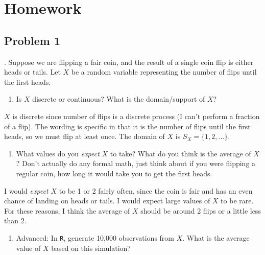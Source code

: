 \documentclass[
]{book}
\providecommand{\tightlist}{%
  \setlength{\itemsep}{0pt}\setlength{\parskip}{0pt}}
\begin{document}
\hypertarget{homework-9}{%
\section{Homework}\label{homework-9}}

\hypertarget{problem-1-9}{%
\subsection{Problem 1}\label{problem-1-9}}

. Suppose we are flipping a fair coin, and the result of a single coin flip is either heads or tails. Let \(X\) be a random variable representing the number of flips until the first heads.

\begin{enumerate}
\def\labelenumi{\alph{enumi}.}
\tightlist
\item
  Is \(X\) discrete or continuous? What is the domain/support of \(X\)?
\end{enumerate}

\(X\) is discrete since number of flips is a discrete process (I can't perform a fraction of a flip). The wording is specific in that it is the number of flips until the first heads, so we must flip at least once. The domain of \(X\) is \(S_X=\{1,2,...\}\).

\begin{enumerate}
\def\labelenumi{\alph{enumi}.}
\setcounter{enumi}{1}
\tightlist
\item
  What values do you \emph{expect} \(X\) to take? What do you think is the average of \(X\)? Don't actually do any formal math, just think about if you were flipping a regular coin, how long it would take you to get the first heads.
\end{enumerate}

I would \emph{expect} \(X\) to be 1 or 2 fairly often, since the coin is fair and has an even chance of landing on heads or tails. I would expect large values of \(X\) to be rare. For these reasons, I think the average of \(X\) should be around 2 flips or a little less than 2.

\begin{enumerate}
\def\labelenumi{\alph{enumi}.}
\setcounter{enumi}{2}
\tightlist
\item
  Advanced: In \texttt{R}, generate 10,000 observations from \(X\). What is the average value of \(X\) based on this simulation?
\end{enumerate}
\end{document}
